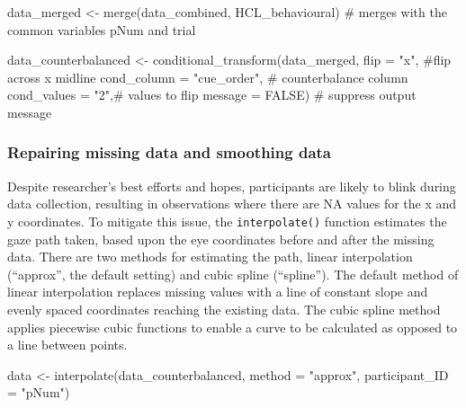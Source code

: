 \documentclass[
  man,
  floatsintext,
  longtable,
  nolmodern,
  notxfonts,
  notimes,
  colorlinks=true,linkcolor=blue,citecolor=blue,urlcolor=blue]{apa7}
\newenvironment{Shaded}{\begin{snugshade}}{\end{snugshade}}
\newcommand{\AttributeTok}[1]{\textcolor[rgb]{0.40,0.45,0.13}{#1}}
\newcommand{\CommentTok}[1]{\textcolor[rgb]{0.37,0.37,0.37}{#1}}
\newcommand{\ConstantTok}[1]{\textcolor[rgb]{0.56,0.35,0.01}{#1}}
\newcommand{\FunctionTok}[1]{\textcolor[rgb]{0.28,0.35,0.67}{#1}}
\newcommand{\NormalTok}[1]{\textcolor[rgb]{0.00,0.23,0.31}{#1}}
\newcommand{\OtherTok}[1]{\textcolor[rgb]{0.00,0.23,0.31}{#1}}
\newcommand{\StringTok}[1]{\textcolor[rgb]{0.13,0.47,0.30}{#1}}
\begin{document}
\begin{Shaded}
\begin{Highlighting}[]
\NormalTok{data\_merged }\OtherTok{\textless{}{-}} \FunctionTok{merge}\NormalTok{(data\_combined, HCL\_behavioural) }\CommentTok{\# merges with the common variables pNum and trial}

\NormalTok{data\_counterbalanced }\OtherTok{\textless{}{-}} 
  \FunctionTok{conditional\_transform}\NormalTok{(data\_merged, }
                        \AttributeTok{flip =} \StringTok{"x"}\NormalTok{, }\CommentTok{\#flip across x midline}
                        \AttributeTok{cond\_column =} \StringTok{"cue\_order"}\NormalTok{, }\CommentTok{\# counterbalance column }
                        \AttributeTok{cond\_values =} \StringTok{"2"}\NormalTok{,}\CommentTok{\# values to flip}
                        \AttributeTok{message =} \ConstantTok{FALSE}\NormalTok{) }\CommentTok{\# suppress output message}
\end{Highlighting}
\end{Shaded}

\subsubsection{Repairing missing data and smoothing
data}\label{repairing-missing-data-and-smoothing-data}

Despite researcher's best efforts and hopes, participants are likely to
blink during data collection, resulting in observations where there are
NA values for the x and y coordinates. To mitigate this issue, the
\texttt{interpolate()} function estimates the gaze path taken, based
upon the eye coordinates before and after the missing data. There are
two methods for estimating the path, linear interpolation (``approx'',
the default setting) and cubic spline (``spline''). The default method
of linear interpolation replaces missing values with a line of constant
slope and evenly spaced coordinates reaching the existing data. The
cubic spline method applies piecewise cubic functions to enable a curve
to be calculated as opposed to a line between points.

\begin{Shaded}
\begin{Highlighting}[]
\NormalTok{data }\OtherTok{\textless{}{-}} \FunctionTok{interpolate}\NormalTok{(data\_counterbalanced, }
                    \AttributeTok{method =} \StringTok{"approx"}\NormalTok{,}
                    \AttributeTok{participant\_ID =} \StringTok{"pNum"}\NormalTok{)}
\end{Highlighting}
\end{Shaded}
\end{document}

